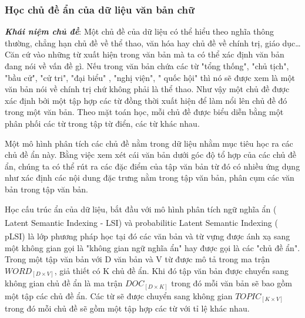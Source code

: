 \documentclass[fontsize=13pt]{scrartcl}
\begin{document}
\subsubsection{Học chủ đề ẩn của dữ liệu văn bản chữ}
\textbf{\textit{Khái niệm chủ đề}}: Một chủ đề của dữ liệu có thể hiểu theo nghĩa thông thường, chẳng hạn chủ đề về thể thao, văn hóa hay chủ đề về chính trị, giáo dục…Căn cứ vào những từ xuất hiện trong văn bản mà ta có thể xác định văn bản đang nói về vấn đề gì. Nếu trong văn bản chứa các từ "tổng thống", "chủ tịch", "bầu cử", "cử tri", "đại biểu" , "nghị viện", " quốc hội" thì nó sẽ được xem là một văn bản nói về chính trị chứ không phải là thể thao. Như vậy một chủ đề được xác định bởi một tập hợp các từ đồng thời xuất hiện để làm nổi lên chủ đề đó trong một văn bản. Theo mặt toán học, mỗi chủ đề được biểu diễn bằng một phân phối các từ trong tập từ điển, các từ khác nhau. 
\par 
Một mô hình phân tích các chủ đề nằm trong dữ liệu nhằm mục tiêu học ra các chủ đề ẩn này.  Bằng việc xem xét cái văn bản dưới góc độ tổ hợp của các chủ đề ẩn, chúng ta có thể rút ra các đặc điểm của tập văn bản từ đó có nhiều ứng dụng như xác định các nội dung đặc trưng nằm trong tập văn bản, phân cụm các văn bản trong tập văn bản.
\par 
Học cấu trúc ẩn của dữ liệu, bắt đầu với mô hình phân tích ngữ nghĩa ẩn ( Latent Semantic Indexing - LSI) \textsuperscript{\cite{LSI}} và probabilitic Latent Semantic Indexing ( pLSI)\textsuperscript{\cite{plsi}} là lớp phương pháp học tại đó các văn bản và từ vựng được ánh xạ sang một không gian gọi là "không gian ngữ nghĩa ẩn"  hay được gọi là các "chủ đề ẩn". Trong một tập văn bản với D văn bản và V từ được mô tả trong ma trận $WORD_{[D\times V]}$, giả thiết có K chủ đề ẩn. Khi đó tập văn bản được chuyển sang không gian chủ đề ẩn là ma trận $DOC_{[D\times K]}$ trong đó mỗi văn bản sẽ bao gồm một tập các chủ đề ẩn. Các từ sẽ được chuyển sang không gian $TOPIC_{[K\times V]}$ trong đó mỗi chủ đề sẽ gồm một tập hợp các từ với tỉ lệ khác nhau.
\par
\end{document}
